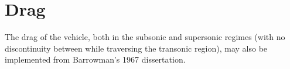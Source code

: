 \documentclass[11pt,dvipsnames]{thesis}
\begin{document}
%


\section{Drag}
The drag of the vehicle, both in the subsonic and supersonic regimes (with no discontinuity between while traversing the transonic region), may also be implemented from Barrowman's 1967 dissertation. 
\end{document}

